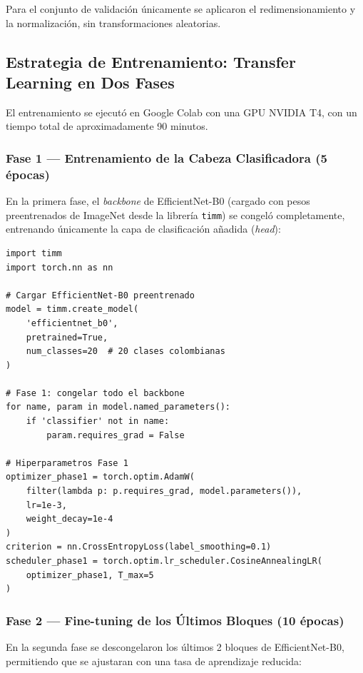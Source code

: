 \documentclass[12pt,a4paper]{article}
\begin{document}
Para el conjunto de validación únicamente se aplicaron el redimensionamiento y la normalización, sin transformaciones aleatorias.

\subsection{Estrategia de Entrenamiento: Transfer Learning en Dos Fases}

El entrenamiento se ejecutó en Google Colab con una GPU NVIDIA T4, con un tiempo total de aproximadamente 90 minutos.

\subsubsection{Fase 1 — Entrenamiento de la Cabeza Clasificadora (5 épocas)}

En la primera fase, el \textit{backbone} de EfficientNet-B0 (cargado con pesos preentrenados de ImageNet desde la librería \texttt{timm}) se congeló completamente, entrenando únicamente la capa de clasificación añadida (\textit{head}):

\begin{lstlisting}[caption={Configuración de Fase 1: backbone congelado}, label={lst:phase1}]
import timm
import torch.nn as nn

# Cargar EfficientNet-B0 preentrenado
model = timm.create_model(
    'efficientnet_b0',
    pretrained=True,
    num_classes=20  # 20 clases colombianas
)

# Fase 1: congelar todo el backbone
for name, param in model.named_parameters():
    if 'classifier' not in name:
        param.requires_grad = False

# Hiperparametros Fase 1
optimizer_phase1 = torch.optim.AdamW(
    filter(lambda p: p.requires_grad, model.parameters()),
    lr=1e-3,
    weight_decay=1e-4
)
criterion = nn.CrossEntropyLoss(label_smoothing=0.1)
scheduler_phase1 = torch.optim.lr_scheduler.CosineAnnealingLR(
    optimizer_phase1, T_max=5
)
\end{lstlisting}

\subsubsection{Fase 2 — Fine-tuning de los Últimos Bloques (10 épocas)}

En la segunda fase se descongelaron los últimos 2 bloques de EfficientNet-B0, permitiendo que se ajustaran con una tasa de aprendizaje reducida:
\end{document}
